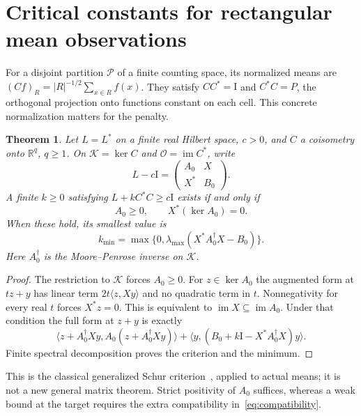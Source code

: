 \documentclass[11pt,a4paper]{article}
\newtheorem{theorem}{Theorem}
\newcommand{\R}{\mathbb R}
\newcommand{\im}{\operatorname{im}}
\newcommand{\id}{\mathrm I}
\begin{document}
\section{Critical constants for rectangular mean observations}
For a disjoint partition $\mathcal P$ of a finite counting space, its
normalized means are $(Cf)_R=|R|^{-1/2}\sum_{x\in R}f(x)$. They satisfy
$CC^*=\id$ and $C^*C=P$, the orthogonal projection onto functions constant
on each cell. This concrete normalization matters for the penalty.

\begin{theorem}\label{thm:critical}
Let $L=L^*$ on a finite real Hilbert space, $c>0$, and $C$ a coisometry
onto $\R^q$, $q\geq1$. On $\mathcal K=\ker C$ and
$\mathcal O=\im C^*$, write
\[
 L-c\id=\begin{pmatrix}A_0&X\\X^*&B_0\end{pmatrix}.
\]
A finite $k\geq0$ satisfying $L+kC^*C\geq c\id$ exists if and only if
\begin{equation}\label{eq:compatibility}
 A_0\geq0,\qquad X^*(\ker A_0)=0.
\end{equation}
When these hold, its smallest value is
\[
 k_{\min}=\max\{0,\lambda_{\max}(X^*A_0^\dagger X-B_0)\}.
\]
Here $A_0^\dagger$ is the Moore--Penrose inverse on $\mathcal K$.
\end{theorem}
\begin{proof}
The restriction to $\mathcal K$ forces $A_0\geq0$. For $z\in\ker A_0$
the augmented form at $tz+y$ has linear term $2t\langle z,Xy\rangle$
and no quadratic term in $t$. Nonnegativity for every real $t$ forces
$X^*z=0$. This is equivalent to $\im X\subseteq\im A_0$. Under that
condition the full form at $z+y$ is exactly
\[
 \langle z+A_0^\dagger Xy,A_0(z+A_0^\dagger Xy)\rangle
 +\langle y,(B_0+k\id-X^*A_0^\dagger X)y\rangle.
\]
Finite spectral decomposition proves the criterion and the minimum.
\end{proof}
This is the classical generalized Schur criterion~\cite[Theorem 1]{Higham},
applied to actual means; it is not a new general matrix theorem. Strict
positivity of $A_0$ suffices, whereas a weak bound at the target requires
the extra compatibility in~\eqref{eq:compatibility}.
\end{document}
